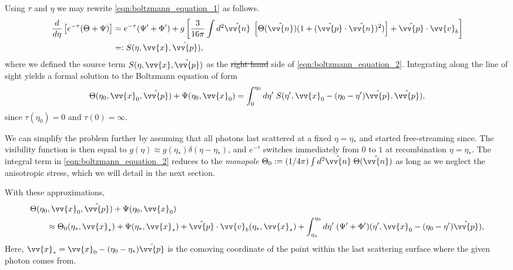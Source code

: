 \documentclass[a4paper,12pt,times,custombib,print,index]{Classes/PhDThesisPSnPDF} %
\providecommand{\DIFadd}[1]{{\protect\color{blue}\uwave{#1}}} %
\providecommand{\DIFdel}[1]{{\protect\color{red}\sout{#1}}}                      %
\providecommand{\DIFaddbegin}{} %
\providecommand{\DIFaddend}{} %
\providecommand{\DIFdelbegin}{} %
\providecommand{\DIFdelend}{} %
\newcommand{\DIFscaledelfig}{0.5}
\newlength{\DIFdelgraphicswidth} %
\newlength{\DIFdelgraphicsheight} %
\newcommand{\DIFaddincludegraphics}[2][]{{\color{blue}\fbox{\DIFOincludegraphics[#1]{#2}}}} %
\newcommand{\DIFdelincludegraphics}[2][]{%
\sbox{\DIFdelgraphicsbox}{\DIFOincludegraphics[#1]{#2}}%
\settoboxwidth{\DIFdelgraphicswidth}{\DIFdelgraphicsbox} %
\settoboxtotalheight{\DIFdelgraphicsheight}{\DIFdelgraphicsbox} %
\scalebox{\DIFscaledelfig}{%
\parbox[b]{\DIFdelgraphicswidth}{\usebox{\DIFdelgraphicsbox}\\[-\baselineskip] \rule{\DIFdelgraphicswidth}{0em}}\llap{\resizebox{\DIFdelgraphicswidth}{\DIFdelgraphicsheight}{%
\setlength{\unitlength}{\DIFdelgraphicswidth}%
\begin{picture}(1,1)%
\thicklines\linethickness{2pt} %
{\color[rgb]{1,0,0}\put(0,0){\framebox(1,1){}}}%
{\color[rgb]{1,0,0}\put(0,0){\line( 1,1){1}}}%
{\color[rgb]{1,0,0}\put(0,1){\line(1,-1){1}}}%
\end{picture}%
}\hspace*{3pt}}} %
} %
\DeclareRobustCommand{\DIFaddbegin}{\DIFOaddbegin \let\includegraphics\DIFaddincludegraphics} %
\DeclareRobustCommand{\DIFaddend}{\DIFOaddend \let\includegraphics\DIFOincludegraphics} %
\DeclareRobustCommand{\DIFdelbegin}{\DIFOdelbegin \let\includegraphics\DIFdelincludegraphics} %
\DeclareRobustCommand{\DIFdelend}{\DIFOaddend \let\includegraphics\DIFOincludegraphics} %
\begin{document}
Using $\tau$ and $\eta$ we may rewrite \eqref{eqn:boltzmann_equation_1} as follows.
\begin{align}
	\frac{d}{d\eta} \left[ e^{-\tau} (\Theta + \Psi) \right] &= e^{-\tau}(\Psi' + \Phi') + g \left[ \frac{3}{16\pi} \int d^2\hat{\vv{n}} \; \left[ \Theta(\hat{\vv{n}}) (1 + (\hat{\vv{p}} \cdot \hat{\vv{n}})^2) \right] + \hat{\vv{p}} \cdot \vv{v}_b \right] \label{eqn:boltzmann_equation_2} \\
	&=: S(\eta, \vv{x}, \hat{\vv{p}}), \label{def:boltzmann_source_term}
\end{align}
where we defined the source term $S(\eta,\vv{x},\hat{\vv{p}})$ as the \DIFdelbegin \DIFdel{right hand }\DIFdelend \DIFaddbegin \DIFadd{right-hand }\DIFaddend side of \eqref{eqn:boltzmann_equation_2}. Integrating along the line of sight yields a formal solution to the Boltzmann equation of \DIFaddbegin \DIFadd{the }\DIFaddend form
\begin{align}
	\Theta(\eta_0, \vv{x}_0, \hat{\vv{p}}) + \Psi(\eta_0, \vv{x}_0) = \int_0^{\eta_0} d\eta' \; S(\eta', \vv{x}_0 - (\eta_0 -\eta') \hat{\vv{p}}, \hat{\vv{p}}), 
\end{align}
since $\tau(\eta_0)=0$ and $\tau(0) = \infty$.

We can simplify the problem further by assuming that all photons last scattered at a fixed $\eta=\eta_*$ and \DIFaddbegin \DIFadd{have }\DIFaddend started free-streaming since. The visibility function is then equal to $g(\eta)\approx g(\eta_*)\delta(\eta-\eta_*)$, and $e^{-\tau}$ switches immediately from $0$ to $1$ at recombination $\eta=\eta_*$. The integral term in \eqref{eqn:boltzmann_equation_2} reduces to the \textit{monopole} $\Theta_0 := (1/4\pi)\int d^2\hat{\vv{n}} \;\Theta(\hat{\vv{n}})$ as long as we neglect the anisotropic stress, which we will detail in the next section. 

With these approximations,
\begin{align}
	&\Theta(\eta_0, \vv{x}_0, \hat{\vv{p}}) + \Psi(\eta_0, \vv{x}_0) \nonumber \\
	&\qquad \approx \Theta_0(\eta_*, \vv{x}_*) + \Psi(\eta_*, \vv{x}_*) + \hat{\vv{p}}\cdot \vv{v}_b (\eta_*, \vv{x}_*) + \int_{\eta_*}^{\eta_0} d\eta' \; (\Psi' + \Phi')(\eta', \vv{x}_0-(\eta_0-\eta')\hat{\vv{p}}), \label{eqn:line_of_sight_solution_approximated}
\end{align}
Here, $\vv{x}_* = \vv{x}_0-(\eta_0-\eta_*)\hat{\vv{p}}$ is the comoving coordinate of the point within the last scattering surface where the given photon comes from.
\end{document}
